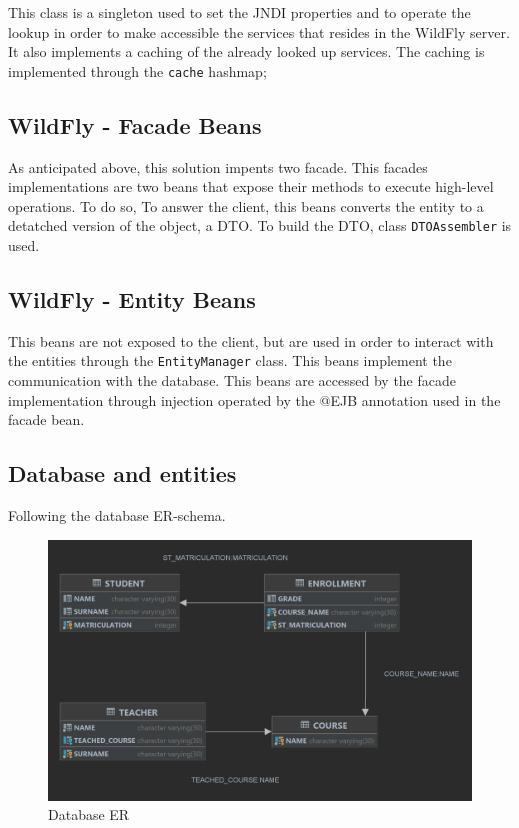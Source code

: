 \documentclass{article}
\begin{document}
This class is a singleton used to set the JNDI properties and to operate the lookup in order to make accessible the services that resides in the WildFly server. It also implements a caching of the already looked up services. The caching is implemented through the \texttt{cache} hashmap;

\subsection*{WildFly - Facade Beans}

As anticipated above, this solution impents two facade. This facades implementations are two beans that expose their methods to execute high-level operations. To do so,  
To answer the client, this beans converts the entity to a detatched version of the object, a DTO. To build the DTO, class \texttt{DTOAssembler} is used.

\subsection*{WildFly - Entity Beans}

This beans are not exposed to the client, but are used in order to interact with the entities through the \texttt{EntityManager} class. This beans implement the communication with the database. This beans are accessed by the facade implementation through injection operated by the @EJB annotation used in the facade bean.

\subsection*{Database and entities}

Following the database ER-schema.

\begin{figure}[h!]
    \centering
    \includegraphics[keepaspectratio,width=1\textwidth]{drawable/Assignment4_ER.png}
    \caption{Database ER}
\end{figure}
\end{document}
